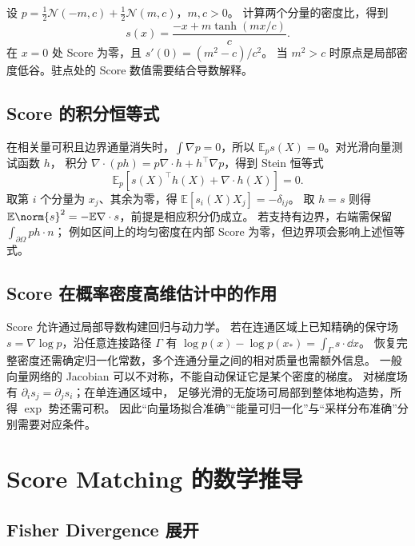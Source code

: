 \begin{example}[两分量混合中的后验权重]
设 \(p=\tfrac12\mathcal N(-m,c)+\tfrac12\mathcal N(m,c)\)，\(m,c>0\)。
计算两个分量的密度比，得到
\[
 s(x)=\frac{-x+m\tanh(mx/c)}c.
\]
在 \(x=0\) 处 Score 为零，且 \(s'(0)=(m^2-c)/c^2\)。
当 \(m^2>c\) 时原点是局部密度低谷。驻点处的 Score 数值需要结合导数解释。
\end{example}

\subsection{Score 的积分恒等式}

在相关量可积且边界通量消失时，\(\int\nabla p=0\)，所以
\(\mathbb E_p s(X)=0\)。对光滑向量测试函数 \(h\)，
积分 \(\nabla\cdot(ph)=p\nabla\cdot h+h^\top\nabla p\)，得到 Stein 恒等式
\begin{equation}
 \mathbb E_p[s(X)^\top h(X)+\nabla\cdot h(X)]=0.
 \label{eq:fields-stein}
\end{equation}
取第 \(i\) 个分量为 \(x_j\)、其余为零，得
\(\mathbb E[s_i(X)X_j]=-\delta_{ij}\)。
取 \(h=s\) 则得
\(\mathbb E\norm{s}^2=-\mathbb E\nabla\cdot s\)，前提是相应积分仍成立。
若支持有边界，右端需保留 \(\int_{\partial\Omega}ph\cdot n\)；
例如区间上的均匀密度在内部 Score 为零，但边界项会影响上述恒等式。

\subsection{Score 在概率密度高维估计中的作用}

Score 允许通过局部导数构建回归与动力学。
若在连通区域上已知精确的保守场 \(s=\nabla\log p\)，沿任意连接路径 \(\Gamma\)
有 \(\log p(x)-\log p(x_*)=\int_\Gamma s\cdot\dd x\)。
恢复完整密度还需确定归一化常数，多个连通分量之间的相对质量也需额外信息。
一般向量网络的 Jacobian 可以不对称，不能自动保证它是某个密度的梯度。
对梯度场有 \(\partial_i s_j=\partial_j s_i\)；在单连通区域中，
足够光滑的无旋场可局部到整体地构造势，所得 \(\exp\) 势还需可积。
因此“向量场拟合准确”“能量可归一化”与“采样分布准确”分别需要对应条件。

\section{Score Matching 的数学推导}
\label{sec:fields-sm}

\subsection{Fisher Divergence 展开}

